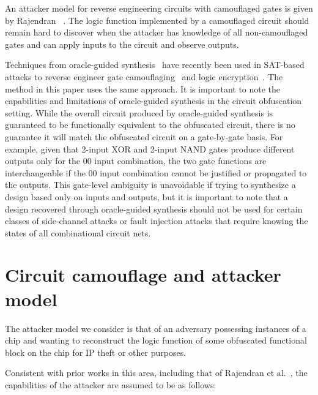 \documentclass[proposal]{umassthesis}  %
\begin{document}
An attacker model for reverse engineering circuits with camouflaged gates is given by Rajendran ~\cite{rajendran-12}. The logic function implemented by a camouflaged circuit should remain hard to discover when the attacker has knowledge of all non-camouflaged gates and can apply inputs to the circuit and observe outputs. {Techniques from oracle-guided synthesis~\cite{jha2010oracle} have recently been used in SAT-based attacks to reverse engineer gate camouflaging~\cite{elmassad-15} and logic encryption~\cite{subramanyan-15}. The method in this paper uses the same approach. It is important to note the capabilities and limitations of oracle-guided synthesis in the circuit obfuscation setting. While the overall circuit produced by oracle-guided synthesis is guaranteed to be functionally equivalent to the obfuscated circuit, there is no guarantee it will match the obfuscated circuit on a gate-by-gate basis. For example, given that 2-input XOR and 2-input NAND gates produce different outputs only for the 00 input combination, the two gate functions are interchangeable if the 00 input combination cannot be justified or propagated to the outputs. This gate-level ambiguity is unavoidable if trying to synthesize a design based only on inputs and outputs, but it is important to note that a design recovered through oracle-guided synthesis should not be used for certain classes of side-channel attacks or fault injection attacks that require knowing the states of all combinational circuit nets. 




















\chapter{Circuit camouflage and attacker model}

The attacker model we consider is that of an adversary possessing instances of a chip and wanting to reconstruct the logic function of some obfuscated functional block on the chip for IP theft or other purposes.} Consistent with prior works in this area, including that of Rajendran et al.~\cite{rajendran-13}, the capabilities of the attacker are assumed to be as follows: 
\end{document}
